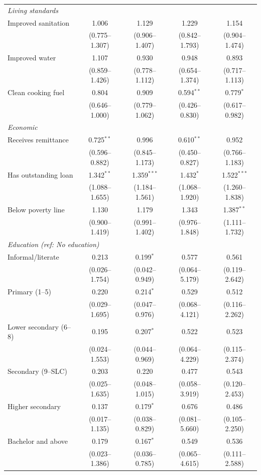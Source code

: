 \begin{table}[htbp]
\begin{tabular}{lcccc}
\multicolumn{5}{l}{\textit{Living standards}} \\
\quad Improved sanitation & 1.006 & 1.129 & 1.229 & 1.154 \\
\quad & (0.775--1.307) & (0.906--1.407) & (0.842--1.793) & (0.904--1.474) \\
\quad Improved water & 1.107 & 0.930 & 0.948 & 0.893 \\
\quad & (0.859--1.426) & (0.778--1.112) & (0.654--1.374) & (0.717--1.113) \\
\quad Clean cooking fuel & 0.804 & 0.909 & 0.594$^{**}$ & 0.779$^{*}$ \\
\quad & (0.646--1.000) & (0.779--1.062) & (0.426--0.830) & (0.617--0.982) \\

\multicolumn{5}{l}{\textit{Economic}} \\
\quad Receives remittance & 0.725$^{**}$ & 0.996 & 0.610$^{**}$ & 0.952 \\
\quad & (0.596--0.882) & (0.845--1.173) & (0.450--0.827) & (0.766--1.183) \\
\quad Has outstanding loan & 1.342$^{**}$ & 1.359$^{***}$ & 1.432$^{*}$ & 1.522$^{***}$ \\
\quad & (1.088--1.655) & (1.184--1.561) & (1.068--1.920) & (1.260--1.838) \\
\quad Below poverty line & 1.130 & 1.179 & 1.343 & 1.387$^{**}$ \\
\quad & (0.900--1.419) & (0.991--1.402) & (0.976--1.848) & (1.111--1.732) \\

\multicolumn{5}{l}{\textit{Education (ref: No education)}} \\
\quad Informal/literate & 0.213 & 0.199$^{*}$ & 0.577 & 0.561 \\
\quad & (0.026--1.754) & (0.042--0.949) & (0.064--5.179) & (0.119--2.642) \\
\quad Primary (1--5) & 0.220 & 0.214$^{*}$ & 0.529 & 0.512 \\
\quad & (0.029--1.695) & (0.047--0.976) & (0.068--4.121) & (0.116--2.262) \\
\quad Lower secondary (6--8) & 0.195 & 0.207$^{*}$ & 0.522 & 0.523 \\
\quad & (0.024--1.553) & (0.044--0.969) & (0.064--4.229) & (0.115--2.374) \\
\quad Secondary (9--SLC) & 0.203 & 0.220 & 0.477 & 0.543 \\
\quad & (0.025--1.635) & (0.048--1.015) & (0.058--3.919) & (0.120--2.453) \\
\quad Higher secondary & 0.137 & 0.179$^{*}$ & 0.676 & 0.486 \\
\quad & (0.017--1.135) & (0.038--0.829) & (0.081--5.660) & (0.105--2.250) \\
\quad Bachelor and above & 0.179 & 0.167$^{*}$ & 0.549 & 0.536 \\
\quad & (0.023--1.386) & (0.036--0.785) & (0.065--4.615) & (0.111--2.588) \\


\end{tabular}
\end{table}
